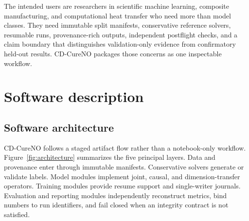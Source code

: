 \documentclass[preprint,12pt]{elsarticle}
\begin{document}
The intended users are researchers in scientific machine learning, composite
manufacturing, and computational heat transfer who need more than model
classes. They need immutable split manifests, conservative reference solvers,
resumable runs, provenance-rich outputs, independent postflight checks, and a
claim boundary that distinguishes validation-only evidence from confirmatory
held-out results. CD-CureNO packages those concerns as one inspectable workflow.

\section{Software description}

\subsection{Software architecture}

CD-CureNO follows a staged artifact flow rather than a notebook-only workflow.
Figure~\ref{fig:architecture} summarizes the five principal layers. Data and
provenance enter through immutable manifests. Conservative solvers generate or
validate labels. Model modules implement joint, causal, and dimension-transfer
operators. Training modules provide resume support and single-writer
journals. Evaluation and reporting modules independently reconstruct metrics,
bind numbers to run identifiers, and fail closed when an integrity contract is
not satisfied.
\end{document}
